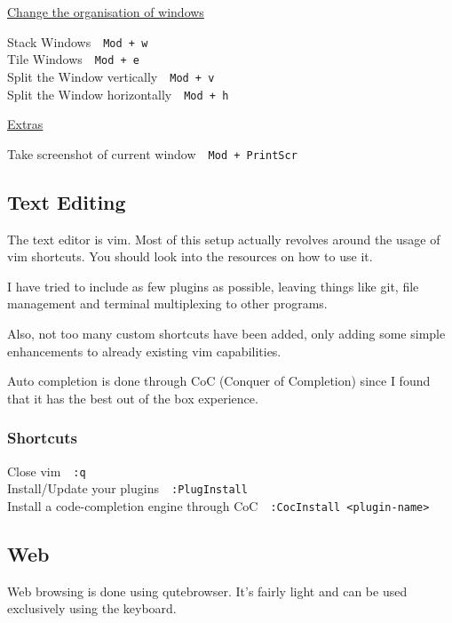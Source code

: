 \documentclass{article}
\let\src\texttt
\newcommand{\shortcut}[2]{#1~\dotfill{}~\src{#2}\\} %
\newcommand{\editor}{vim}
\newcommand{\browser}{qutebrowser}
\newcommand{\shortcuttitle}[1]{\underline{#1}}
\begin{document}
\begin{minipage}{\textwidth}
    \shortcuttitle{Change the organisation of windows}
    \newline

    \shortcut{Stack Windows}{Mod + w}
    \shortcut{Tile Windows}{Mod + e}

    \shortcut{Split the Window vertically}{Mod + v}
    \shortcut{Split the Window horizontally}{Mod + h}
\end{minipage}

\begin{minipage}{\textwidth}
    \shortcuttitle{Extras}

    \shortcut{Take screenshot of current window}{Mod + PrintScr}

\end{minipage}

\subsection{Text Editing}

The text editor is \editor. Most of this setup actually 
revolves around the usage of \editor{} shortcuts. You should 
look into the resources on how to use it. 

I have tried to include as few plugins as possible, leaving
things like git, file management and terminal multiplexing to other programs. 

Also, not too many custom shortcuts have been added, only adding 
some simple enhancements to already existing vim capabilities.

Auto completion is done through CoC (Conquer of Completion) since I found that it has 
the best out of the box experience. 

\subsubsection{Shortcuts}

\shortcut{Close \editor}{:q}

\shortcut{Install/Update your plugins}{:PlugInstall}
\shortcut{Install a code-completion engine through CoC}{:CocInstall \textless plugin-name\textgreater}

\subsection{Web}

Web browsing is done using \browser. It's fairly light and can be used 
exclusively using the keyboard. 
\end{document}
